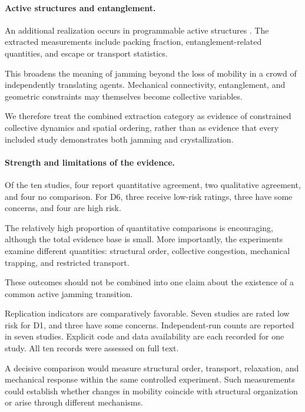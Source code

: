 \paragraph*{Active structures and entanglement.}

An additional realization occurs
in programmable active structures
\cite{Rezanejad2025programmableentangl}.
The extracted measurements include
packing fraction, entanglement-related
quantities, and escape or
transport statistics.

This broadens the meaning of
jamming beyond the loss of
mobility in a crowd of
independently translating
agents. Mechanical connectivity,
entanglement, and geometric
constraints may themselves
become collective variables.



We therefore treat the
combined extraction category
as evidence of constrained
collective dynamics and
spatial ordering, rather
than as evidence that
every included study
demonstrates both
jamming and crystallization.

\paragraph*{Strength and limitations of the evidence.}

Of the ten studies, four report
quantitative agreement,
two qualitative agreement,
and four no comparison.
For D6, three receive
low-risk ratings,
three have some concerns,
and four are high risk.

The relatively high proportion
of quantitative comparisons
is encouraging, although
the total evidence base
is small. More importantly,
the experiments examine
different quantities:
structural order,
collective congestion,
mechanical trapping,
and restricted transport.

These outcomes should not
be combined into one
claim about the existence
of a common active
jamming transition.

Replication indicators
are comparatively favorable.
Seven studies are rated
low risk for D1,
and three have
some concerns.
Independent-run counts
are reported in seven
studies. Explicit
code and data
availability are each
recorded for one study.
All ten records were
assessed on full text.



A decisive comparison
would measure structural
order, transport,
relaxation, and
mechanical response
within the same
controlled experiment.
Such measurements
could establish whether
changes in mobility
coincide with
structural organization
or arise through
different mechanisms.

